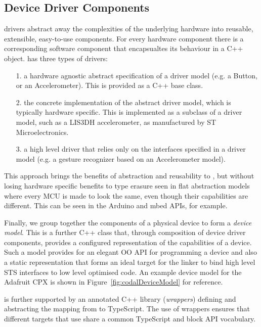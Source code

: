 \subsection{Device Driver Components}
\CO drivers abstract away the complexities of the underlying hardware into reusable, extensible, easy-to-use components. For every hardware component there is a corresponding software component that encapsualtes its behaviour in a C++ object. \CO has three types of drivers:
\begin{itemize}
    \item[1.] a hardware agnostic abstract specification of a driver model (e.g. a Button, or an Accelerometer). This is provided as a C++ base class.
    \item[2.] the concrete implementation of the abstract driver model, which is typically hardware specific. This is implemented as a subclass of a driver model, such as a LIS3DH accelerometer, as manufactured by ST Microelectronics.
    \item[3.] a high level driver that relies only on the interfaces specified in a driver model (e.g. a gesture recognizer based on an Accelerometer model).

\end{itemize}

This approach brings the benefits of abstraction and reusability to \CO, but without losing hardware specific benefits to type erasure seen in flat abstraction models where every MCU is made to look the same, even though their capabilities are different. This can be seen in the Arduino and mbed APIs, for example.

Finally, we group together the components of a physical device to form a \emph{device model}. This is a further C++ class that, through composition of device driver components, provides a configured representation of the capabilities of a device. Such a model provides for an elegant OO API for programming a device and also a static representation that forms an ideal target for the \MCN linker to bind high level STS interfaces to low level optimised code. An example device model for the Adafruit CPX is shown in Figure~\ref{fig:codalDeviceModel} for reference.

 \MCN is further supported by an annotated C++ library (\emph{\MC wrappers}) defining and abstracting the mapping from \CO to TypeScript. The use of \MC wrappers ensures that different \MCN targets that use \CO share a common TypeScript and block API vocabulary.

